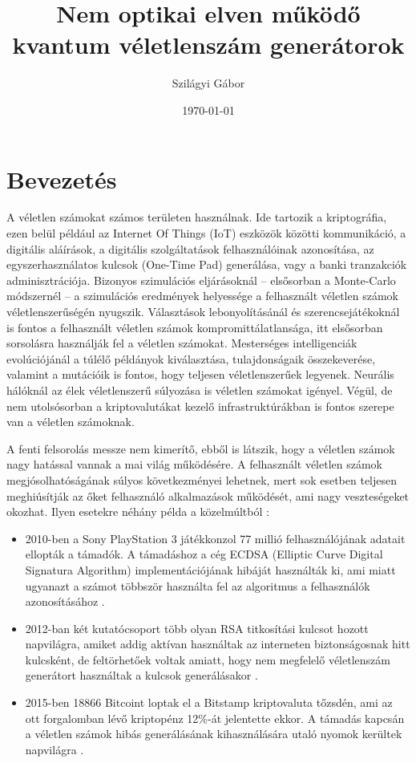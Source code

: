 \documentclass[12pt,a4paper,oneside]{article}
\title{Nem optikai elven működő \\ kvantum véletlenszám generátorok}
\author{Szilágyi Gábor}
\date{\today}
\begin{document}
\maketitle
\section*{Bevezetés}
A véletlen számokat számos területen használnak. Ide tartozik a kriptográfia, ezen belül például az Internet Of Things (IoT) eszközök közötti kommunikáció, a digitális aláírások, a digitális szolgáltatások felhasználóinak azonosítása, az egyszerhasználatos kulcsok (One-Time Pad) generálása, vagy a banki tranzakciók adminisztrációja. Bizonyos szimulációs eljárásoknál -- elsősorban a Monte-Carlo módszernél -- a szimulációs eredmények helyessége a felhasznált véletlen számok véletlenszerűségén nyugszik. Választások lebonyolításánál és szerencsejátékoknál is fontos a felhasznált véletlen számok kompromittálatlansága, itt elsősorban sorsolásra használják fel a véletlen számokat. Mesterséges intelligenciák evolúciójánál a túlélő példányok kiválasztása, tulajdonságaik összekeverése, valamint a mutációik is fontos, hogy teljesen véletlenszerűek legyenek. Neurális hálóknál az élek véletlenszerű súlyozása is véletlen számokat igényel. Végül, de nem utolsósorban a kriptovalutákat kezelő infrastruktúrákban is fontos szerepe van a véletlen számoknak.
\par
A fenti felsorolás messze nem kimerítő, ebből is látszik, hogy a véletlen számok nagy hatással vannak a mai világ működésére. A felhasznált véletlen számok megjósolhatóságának súlyos következményei lehetnek, mert sok esetben teljesen meghiúsítják az őket felhasználó alkalmazások működését, ami nagy veszteségeket okozhat. Ilyen esetekre néhány példa a közelmúltból \cite{altalanos-random}:
\begin{itemize}
	\item 2010-ben a Sony PlayStation 3 játékkonzol 77 millió felhasználójának adatait ellopták a támadók. A támadáshoz a cég ECDSA (Elliptic Curve Digital Signatura Algorithm) implementációjának hibáját használták ki, ami miatt ugyanazt a számot többször használta fel az algoritmus a felhasználók azonosításához \cite{sony}.
	\item 2012-ban két kutatócsoport több olyan RSA titkosítási kulcsot hozott napvilágra, amiket addig aktívan használtak az interneten biztonságosnak hitt kulcsként, de feltörhetőek voltak amiatt, hogy nem megfelelő véletlenszám generátort használtak a kulcsok generálásakor \cite{bad-rsa}.
	\item 2015-ben 18866 Bitcoint loptak el a Bitstamp kriptovaluta tőzsdén, ami az ott forgalomban lévő kriptopénz 12\%-át jelentette ekkor. A támadás kapcsán a véletlen számok hibás generálásának kihasználására utaló nyomok kerültek napvilágra \cite{bitstamp}.
\end{itemize}
\end{document}
